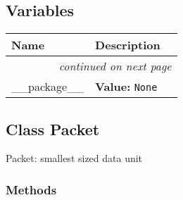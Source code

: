 
  \subsection{Variables}

    \vspace{-1cm}
\hspace{\varindent}\begin{longtable}{|p{\varnamewidth}|p{\vardescrwidth}|l}
\cline{1-2}
\cline{1-2} \centering \textbf{Name} & \centering \textbf{Description}& \\
\cline{1-2}
\endhead\cline{1-2}\multicolumn{3}{r}{\small\textit{continued on next page}}\\\endfoot\cline{1-2}
\endlastfoot\raggedright \_\-\_\-p\-a\-c\-k\-a\-g\-e\-\_\-\_\- & \raggedright \textbf{Value:} 
{\tt None}&\\
\cline{1-2}
\end{longtable}



\subsection{Class Packet}

    \label{FingerprintAttackClasses:Packet}
Packet: smallest sized data unit



  \subsubsection{Methods}

    \label{FingerprintAttackClasses:Packet:__init__}

